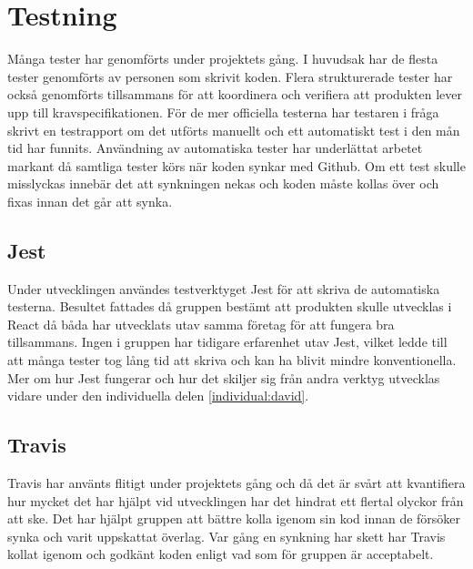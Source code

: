 \section{Testning}
Många tester har genomförts under projektets gång. I huvudsak har de flesta tester genomförts av personen som skrivit koden. Flera strukturerade tester har också genomförts tillsammans för att koordinera och verifiera att produkten lever upp till kravspecifikationen. För de mer officiella testerna har testaren i fråga skrivt en testrapport om det utförts manuellt och ett automatiskt test i den mån tid har funnits. Användning av automatiska tester har underlättat arbetet markant då samtliga tester körs när koden synkar med Github. Om ett test skulle misslyckas innebär det att synkningen nekas och koden måste kollas över och fixas innan det går att synka.
\subsection{Jest}
Under utvecklingen användes testverktyget Jest för att skriva de automatiska testerna. Besultet fattades då gruppen bestämt att produkten skulle utvecklas i React då båda har utvecklats utav samma företag för att fungera bra tillsammans. Ingen i gruppen har tidigare erfarenhet utav Jest, vilket ledde till att många tester tog lång tid att skriva och kan ha blivit mindre konventionella. Mer om hur Jest fungerar och hur det skiljer sig från andra verktyg utvecklas vidare under den individuella delen \ref{individual:david}.
\subsection{Travis}
Travis har använts flitigt under projektets gång och då det är svårt att kvantifiera hur mycket det har hjälpt vid utvecklingen har det hindrat ett flertal olyckor från att ske. Det har hjälpt gruppen att bättre kolla igenom sin kod innan de försöker synka och varit uppskattat överlag. Var gång en synkning har skett har Travis kollat igenom och godkänt koden enligt vad som för gruppen är acceptabelt. 